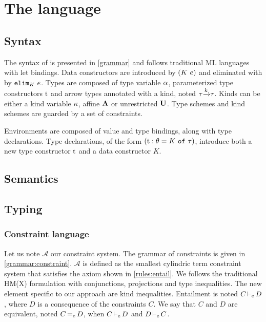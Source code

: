 \section{The \lang language}

\subsection{Syntax}

The syntax of \lang is presented in \cref{grammar} and follows
traditional ML languages with let bindings.
Data constructors are introduced by $(K\ e)$ and eliminated
with by $\mathtt{elim}_{K}\ e$.
Types are composed of type variable $\alpha$, parameterized type constructors
$\mathrm{t}$ and arrow types annotated with a kind, noted $\tau {\xrightarrow{k}} \tau$.
Kinds can be either a kind variable $\kappa$, affine $\mathbf{A}$ or unrestricted $\mathbf{U}$.
Type schemes and kind schemes are guarded by a set of constraints.

Environments are composed of value and type bindings, along with type
declarations. Type declarations, of the form
$(\mathrm{t} : \theta = K\ \mathtt{of}\ \tau)$, introduce both a new type constructor $\mathrm{t}$ and
a data constructor $K$.

\begin{figure*}[t]
  \centering
  
  \caption{Syntax}
  \label{grammar}
\end{figure*}


\clearpage
\subsection{Semantics}


\clearpage
\subsection{Typing}

\subsubsection{Constraint language}

\newcommand\A{\mathcal A}
\newcommand\SC{\mathcal S}

Let us note $\A$ our constraint system. The grammar of constraints is
given in  \cref{grammar:constraint}.
$\A$ is defined as the smallest cylindric term constraint system that
satisfies the axiom shown in \cref{rules:entail}.
We follows the traditional HM(X) formulation
with conjunctions, projections and type inequalities.
The new element specific to our approach are kind inequalities.
Entailment is noted $C \operatorname{\vdash_e} D$, where $D$ is a consequence of the
constraints $C$.
We say that $C$ and $D$ are equivalent, noted $C \operatorname{=_e} D$,
when $C \operatorname{\vdash_e} D$ and $D \operatorname{\vdash_e} C$.

